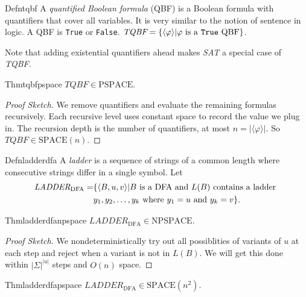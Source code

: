 \begin{reference}{Defn}{tqbf}
  A \emph{quantified Boolean formula} (QBF) is a Boolean formula with quantifiers that cover all variables. It is very similar to the notion of sentence in logic. A QBF is \texttt{True} or \texttt{False}. $\textit{TQBF}=\{\langle \varphi\rangle|\varphi\text{ is a \texttt{True} QBF}\}$.
\end{reference}

Note that adding existential quantifiers ahead makes \textit{SAT} a special case of \textit{TQBF}.

\begin{reference}{Thm}{tqbfpspace}
  $\textit{TQBF}\in \mathrm{PSPACE}.$
\end{reference}

\begin{proof}[Proof Sketch]
  We remove quantifiers and evaluate the remaining formulas recursively. Each recursive level uses constant space to record the value we plug in. The recursion depth is the number of quantifiers, at most $n=|\langle \varphi\rangle|.$ So $\textit{TQBF}\in \mathrm{SPACE}(n)$.
\end{proof}

\begin{reference}{Defn}{ladderdfa}
  A \emph{ladder} is a sequence of strings of a common length where consecutive strings differ in a single symbol. Let
  \begin{align*}
    \textit{LADDER}_{\mathrm{DFA}}= & \{\langle B,u,v\rangle|B \text{ is a DFA and }L(B)\text{ contains a ladder } \\
                                    & y_1,y_2,\dots,y_k\text{ where }y_1=u\text{ and }y_k=v\}.\qedhere
  \end{align*}
\end{reference}

\begin{reference}{Thm}{ladderdfanpspace}
  $\textit{LADDER}_{\mathrm{DFA}}\in \mathrm{NPSPACE}$.
\end{reference}

\begin{proof}[Proof Sketch]
  We nondeterministically try out all possiblities of variants of $u$ at each step and reject when a variant is not in $L(B)$. We will get this done within $|\Sigma|^{|u|}$ steps and $O(n)$ space.
\end{proof}

\begin{reference}{Thm}{ladderdfapspace}
  $\textit{LADDER}_{\mathrm{DFA}}\in \mathrm{SPACE}(n^2)$.
\end{reference}

